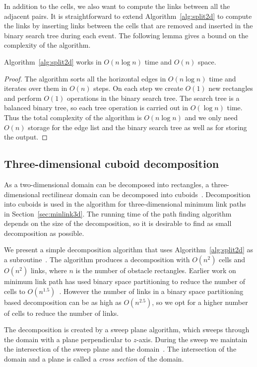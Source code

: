\documentclass[english,gradu]{tktltiki2018}
\begin{document}
In addition to the cells, we also want to compute the links between all the adjacent pairs.
It is straightforward to extend Algorithm~\ref{alg:split2d} to compute the links by inserting links between the cells that are removed and inserted in the binary search tree during each event.
The following lemma gives a bound on the complexity of the algorithm.

\begin{lem}\label{lem:split2dtime}Algorithm~\ref{alg:split2d} works in $O(n\log n)$ time and $O(n)$ space.\end{lem}
\begin{proof}
The algorithm sorts all the horizontal edges in $O(n\log n)$ time and iterates over them in $O(n)$ steps.
On each step we create $O(1)$ new rectangles and perform $O(1)$ operations in the binary search tree.
The search tree is a balanced binary tree, so each tree operation is carried out in $O(\log n)$ time.
Thus the total complexity of the algorithm is $O(n\log n)$ and we only need $O(n)$ storage for the edge list and the binary search tree as well as for storing the output.
\end{proof}

\subsection{Three-dimensional cuboid decomposition}\label{sec:split3d}

As a two-dimensional domain can be decomposed into rectangles, a three-dimensional rectilinear domain can be decomposed into cuboids~\cite{restricted,wagner}.
Decomposition into cuboids is used in the algorithm for three-dimensional minimum link paths in Section~\ref{sec:minlink3d}.
The running time of the path finding algorithm depends on the size of the decomposition, so it is desirable to find as small decomposition as possible.

We present a simple decomposition algorithm that uses Algorithm~\ref{alg:split2d} as a subroutine~\cite{restricted}.
The algorithm produces a decomposition with $O(n^2)$ cells and $O(n^2)$ links, where $n$ is the number of obstacle rectangles.
Earlier work on minimum link path has used binary space partitioning to reduce the number of cells to $O(n^{1.5})$~\cite{bsp,wagner}.
However the number of links in a binary space partitioning based decomposition can be as high as $O(n^{2.5})$, so we opt for a higher number of cells to reduce the number of links.

The decomposition is created by a sweep plane algorithm, which sweeps through the domain with a plane perpendicular to $z$-axis.
During the sweep we maintain the intersection of the sweep plane and the domain~\fspace.
The intersection of the domain and a plane is called a \emph{cross section} of the domain.
\end{document}
